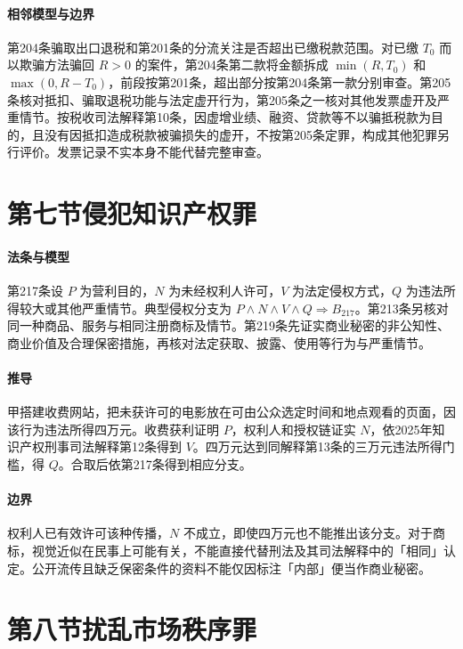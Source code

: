 \paragraph{相邻模型与边界}
第204条骗取出口退税和第201条的分流关注是否超出已缴税款范围。对已缴 \(T_0\) 而以欺骗方法骗回 \(R>0\) 的案件，第204条第二款将金额拆成 \(\min(R,T_0)\) 和 \(\max(0,R-T_0)\)，前段按第201条，超出部分按第204条第一款分别审查。第205条核对抵扣、骗取退税功能与法定虚开行为，第205条之一核对其他发票虚开及严重情节。按税收司法解释第10条，因虚增业绩、融资、贷款等不以骗抵税款为目的，且没有因抵扣造成税款被骗损失的虚开，不按第205条定罪，构成其他犯罪另行评价。发票记录不实本身不能代替完整审查。

\section{第七节\quad 侵犯知识产权罪}

\paragraph{法条与模型}
第217条设 \(P\) 为营利目的，\(N\) 为未经权利人许可，\(V\) 为法定侵权方式，\(Q\) 为违法所得较大或其他严重情节。典型侵权分支为 \(P\land N\land V\land Q\Rightarrow B_{217}\)。第213条另核对同一种商品、服务与相同注册商标及情节。第219条先证实商业秘密的非公知性、商业价值及合理保密措施，再核对法定获取、披露、使用等行为与严重情节。

\paragraph{推导}
甲搭建收费网站，把未获许可的电影放在可由公众选定时间和地点观看的页面，因该行为违法所得四万元。收费获利证明 \(P\)，权利人和授权链证实 \(N\)，依2025年知识产权刑事司法解释第12条得到 \(V\)。四万元达到同解释第13条的三万元违法所得门槛，得 \(Q\)。合取后依第217条得到相应分支。

\paragraph{边界}
权利人已有效许可该种传播，\(N\) 不成立，即使四万元也不能推出该分支。对于商标，视觉近似在民事上可能有关，不能直接代替刑法及其司法解释中的「相同」认定。公开流传且缺乏保密条件的资料不能仅因标注「内部」便当作商业秘密。

\section{第八节\quad 扰乱市场秩序罪}

